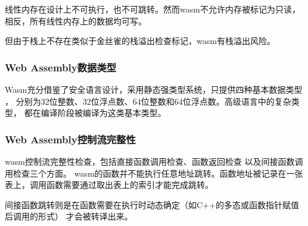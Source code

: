     线性内存在设计上不可执行，也不可跳转。然而wasm不允许内存被标记为只读，
    相反，所有线性内存上的数据均可写\cite{lehmannEverythingOldNew}。

    但由于栈上不存在类似于金丝雀的栈溢出检查标记，wasm有栈溢出风险。

\subsubsection{Web Assembly数据类型}
    Wasm充分借鉴了安全语言设计，采用静态强类型系统，只提供四种基本数据类型
    \cite{wasmCommunityGroup,lehmannEverythingOldNew}，
    分别为32位整数、32位浮点数、64位整数和64位浮点数。高级语言中的复杂类型，
    都在编译阶段被编译为这类基本类型。
\subsubsection{Web Assembly控制流完整性}
    wasm控制流完整性检查，包括直接函数调用检查、函数返回检查
    以及间接函数调用检查三个方面\cite{WebAssemblySummaryOnSecurity,Daniel2019DiscoveringVI}。
    wasm的函数并不能执行任意地址跳转。函数地址被记录在一张表上，调用函数需要通过取出表上的索引才能完成跳转。

    间接函数跳转则是在函数需要在执行时动态确定（如C++的多态或函数指针赋值后调用的形式）
    才会被转译出来\cite{Daniel2019DiscoveringVI}。
